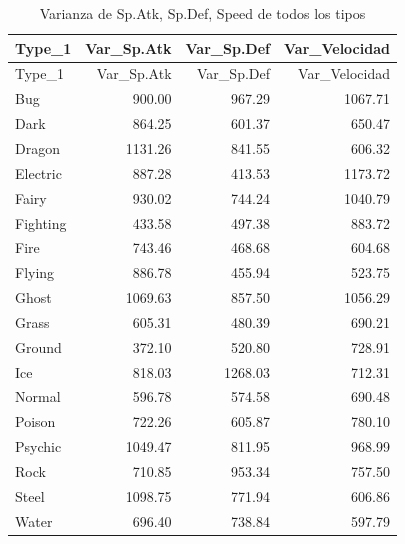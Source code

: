 \documentclass[oneside,11pt]{Latex/Classes/PhDthesisPSnPDF}
\begin{document}
\begin{longtable}[]{@{}lrrr@{}}
\caption{Varianza de Sp.Atk, Sp.Def, Speed de todos los
tipos}\tabularnewline
\toprule\noalign{}
Type\_1 & Var\_Sp.Atk & Var\_Sp.Def & Var\_Velocidad \\
\midrule\noalign{}
\endfirsthead
\toprule\noalign{}
Type\_1 & Var\_Sp.Atk & Var\_Sp.Def & Var\_Velocidad \\
\midrule\noalign{}
\endhead
\bottomrule\noalign{}
\endlastfoot
Bug & 900.00 & 967.29 & 1067.71 \\
Dark & 864.25 & 601.37 & 650.47 \\
Dragon & 1131.26 & 841.55 & 606.32 \\
Electric & 887.28 & 413.53 & 1173.72 \\
Fairy & 930.02 & 744.24 & 1040.79 \\
Fighting & 433.58 & 497.38 & 883.72 \\
Fire & 743.46 & 468.68 & 604.68 \\
Flying & 886.78 & 455.94 & 523.75 \\
Ghost & 1069.63 & 857.50 & 1056.29 \\
Grass & 605.31 & 480.39 & 690.21 \\
Ground & 372.10 & 520.80 & 728.91 \\
Ice & 818.03 & 1268.03 & 712.31 \\
Normal & 596.78 & 574.58 & 690.48 \\
Poison & 722.26 & 605.87 & 780.10 \\
Psychic & 1049.47 & 811.95 & 968.99 \\
Rock & 710.85 & 953.34 & 757.50 \\
Steel & 1098.75 & 771.94 & 606.86 \\
Water & 696.40 & 738.84 & 597.79 \\
\end{longtable}
\end{document}

